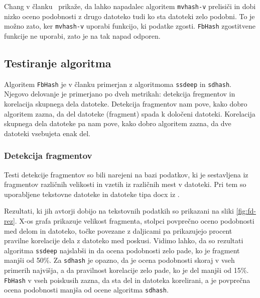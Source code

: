 \documentclass{acm_proc_article-sp}
\begin{document}
Chang v članku~\cite{chang2016security} prikaže, da lahko napadalec algoritem \texttt{mvhash-v} prelisiči in dobi nizko oceno podobnosti z drugo datoteko tudi ko sta datoteki zelo podobni. To je možno zato, ker \texttt{mvhash-v} uporabi funkcijo, ki podatke zgosti. \texttt{FbHash} zgostitvene funkcije ne uporabi, zato je na tak napad odporen.

\subsection{Testiranje algoritma}
Algoritem \texttt{FbHash} je v članku primerjan z algoritmoma \texttt{ssdeep} in \texttt{sdhash}. Njegovo delovanje je primerjano po dveh metrikah: detekcija fregmentov in korelacija skupnega dela datoteke. Detekcija fragmentov nam pove, kako dobro algoritem zazna, da del datoteke (fragment) spada k določeni datoteki. Korelacija skupnega dela datoteke pa nam pove, kako dobro algoritem zazna, da dve datoteki vsebujeta enak del.

\subsubsection{Detekcija fragmentov}

Testi detekcije fragmentov so bili narejeni na bazi podatkov, ki je sestavljena iz fragmentov različnih velikosti in vzetih iz različnih mest v datoteki. Pri tem so uporabljene tekstovne datoteke in datoteke tipa docx iz \cite{dataset}.

Rezultati, ki jih avtorji dobijo na tekstovnih podatkih so prikazani na sliki \ref{fig:fd-rez}. X-os grafa prikazuje velikost fragmenta, stolpci povprečno oceno podobnosti med delom in datoteko, točke povezane z daljicami pa prikazujejo procent pravilne korelacije dela z datoteko med poskusi. Vidimo lahko, da so rezultati algoritma \texttt{ssdeep} najslabši in da ocena podobnosti zelo pade, ko je fragment manjši od 50\%. Za \texttt{sdhash} je opazno, da je ocena podobnosti skoraj v vseh primerih najvišja, a da pravilnost korelacije zelo pade, ko je del manjši od 15\%. \texttt{FbHash} v vseh poiskusih zazna, da sta del in datoteka korelirani, a je povprečna ocena podobnosti manjša od ocene algoritma  \texttt{sdhash}.  
\end{document}
